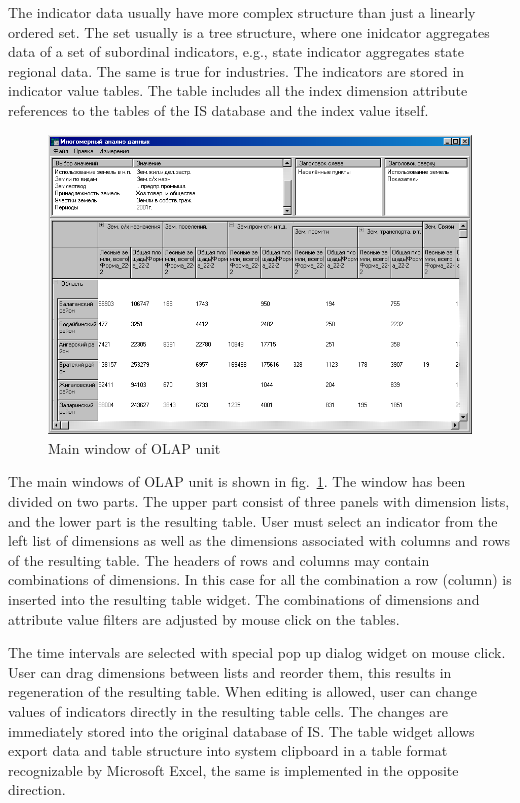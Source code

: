 \documentclass[conference]{IEEEtran}
\begin{document}
The indicator data usually have more complex structure than just a linearly ordered set.  The set usually is a tree structure, where one inidcator aggregates data of a set of subordinal indicators, e.g., state indicator aggregates state regional data.  The same is true for industries.  The indicators are stored in indicator value tables.  The table includes all the index dimension attribute references to the tables of the IS database and the index value itself.

\begin{figure}[bt]
  \centering
  \includegraphics[width=\linewidth]{MDA-olap.png}
  \caption{Main window of OLAP unit}
  \label{fig:olapu}
\end{figure}

The main windows of OLAP unit is shown in fig.~\ref{fig:olapu}.  The window has been divided on two parts.  The upper part consist of three panels with dimension lists, and the lower part is the resulting table.  User must select an indicator from the left list of dimensions as well as the dimensions associated with columns and rows of the resulting table.  The headers of rows and columns may contain combinations of dimensions.  In this case for all the combination a row (column) is inserted into the resulting table widget.  The combinations of dimensions and attribute value filters are adjusted by mouse click on the tables.

The time intervals are selected with special pop up dialog widget on mouse click.  User can drag dimensions between lists and reorder them, this results in regeneration of the resulting table.  When editing is allowed, user can change values of indicators directly in the resulting table cells.  The changes are immediately stored into the original database of IS.  The table widget allows export data and table structure into system clipboard in a table format recognizable by Microsoft Excel, the same is implemented in the opposite direction.
\end{document}
